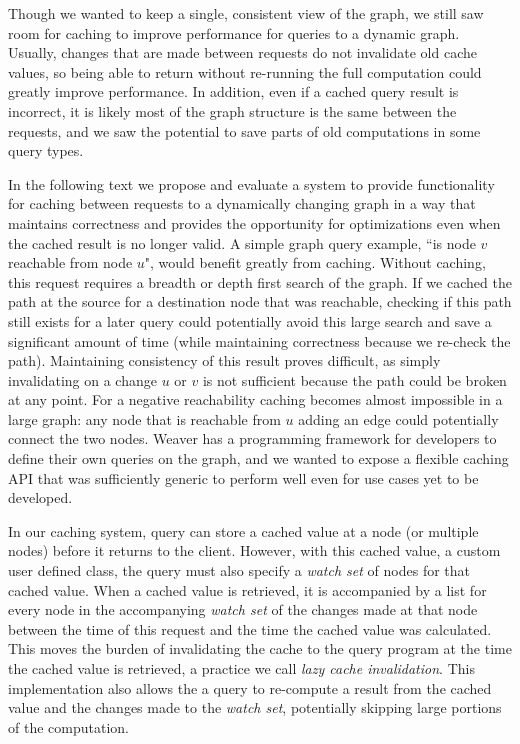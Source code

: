 \documentclass[letterpaper,twocolumn,11pt,tight]{article}
\begin{document}
Though we wanted to keep a single, consistent view of the graph, we still saw room for caching to improve performance for queries to a dynamic graph. Usually, changes that are made between requests do not invalidate old cache values, so being able to return without re-running the full computation could greatly improve performance.
In addition, even if a cached query result is incorrect, it is likely most of the graph structure is the same between the requests, and we saw the potential to save parts of old computations in some query types.

In the following text we propose and evaluate a system to provide functionality for caching between requests to a dynamically changing graph in a way that maintains correctness and provides the opportunity for optimizations even when the cached result is no longer valid.
A simple graph query example, ``is node $v$ reachable from node $u$", would benefit greatly from caching.
Without caching, this request requires a breadth or depth first search of the graph.
If we cached the path at the source for a destination node that was reachable, checking if this path still exists for a later query could potentially avoid this large search and save a significant amount of time (while maintaining correctness because we re-check the path).
Maintaining consistency of this result proves difficult, as simply invalidating on a change $u$ or $v$ is not sufficient because the path could be broken at any point.
For a negative reachability caching becomes almost impossible in a large graph: any node that is reachable from $u$ adding an edge could potentially connect the two nodes.
Weaver has a programming framework for developers to define their own queries on the graph, and we wanted to expose a flexible caching API that was sufficiently generic to perform well even for use cases yet to be developed.

In our caching system, query can store a cached value at a node (or multiple nodes) before it returns to the client. However, with this cached value, a custom user defined class, the query must also specify a \emph{watch set} of nodes for that cached value.
When a cached value is retrieved, it is accompanied by a list for every node in the accompanying \emph{watch set} of the changes made at that node between the time of this request and the time the cached value was calculated.
This moves the burden of invalidating the cache to the query program at the time the cached value is retrieved, a practice we call \emph{lazy cache invalidation}.
This implementation also allows the a query to re-compute a result from the cached value and the changes made to the \emph{watch set}, potentially skipping large portions of the computation.
\end{document}
